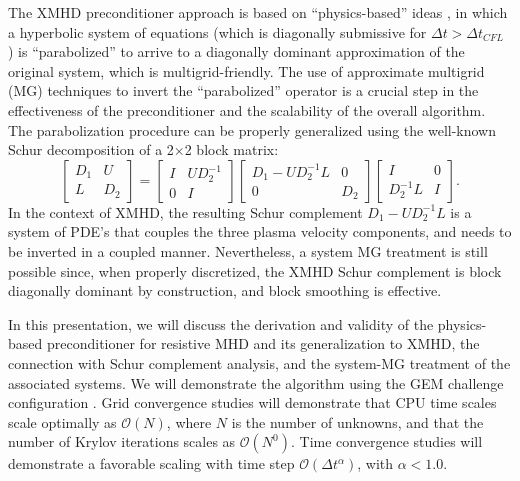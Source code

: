 \documentclass{report}
\begin{document}
The XMHD preconditioner approach is based on {}``physics-based''
ideas \cite{chacon-jcp-02,chacon-jcp-03}, in which a hyperbolic system
of equations (which is diagonally submissive for $\Delta t>\Delta t_{CFL}$
\cite{chacon-jcp-02}) is {}``parabolized'' to arrive to a diagonally
dominant approximation of the original system, which is multigrid-friendly.
The use of approximate multigrid (MG) techniques to invert the {}``parabolized''
operator is a crucial step in the effectiveness of the preconditioner
and the scalability of the overall algorithm. The parabolization procedure
can be properly generalized using the well-known Schur decomposition
of a 2$\times $2 block matrix:{\small \[
\left[\begin{array}{cc}
D_{1} & U\\
L & D_{2}\end{array}
\right]=\left[\begin{array}{cc}
I & UD_{2}^{-1}\\
0 & I\end{array}
\right]\left[\begin{array}{cc}
D_{1}-UD_{2}^{-1}L & 0\\
0 & D_{2}\end{array}
\right]\left[\begin{array}{cc}
I & 0\\
D_{2}^{-1}L & I\end{array}
\right].\]
}In the context of XMHD, the resulting Schur complement $D_{1}-UD_{2}^{-1}L$
is a system of PDE's that couples the three plasma velocity components,
and needs to be inverted in a coupled manner. Nevertheless, a system
MG treatment is still possible since, when properly discretized, the
XMHD Schur complement is block diagonally dominant by construction,
and block smoothing is effective.

In this presentation, we will discuss the derivation and validity
of the physics-based preconditioner for resistive MHD and its generalization
to XMHD, the connection with Schur complement analysis, and the system-MG
treatment of the associated systems. We will demonstrate the algorithm
using the GEM challenge configuration \cite{gem}. Grid convergence
studies will demonstrate that CPU time scales scale optimally as $\mathcal{O}(N)$,
where $N$ is the number of unknowns, and that the number of Krylov
iterations scales as $\mathcal{O}(N^{0})$. Time convergence studies
will demonstrate a favorable scaling with time step $\mathcal{O}(\Delta t^{\alpha })$,
with $\alpha <1.0$.
\end{document}
